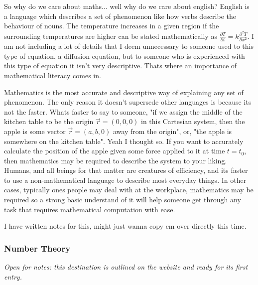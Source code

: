 \documentclass{article}
\newcounter{subsubsubsection}[subsubsection]
\begin{document}
So why do we care about maths... well why do we care about english? English is a language which describes a set of phenomenon like how verbs describe the behaviour of nouns. The temperature increases in a given region if the surrounding temperatures are higher can be stated mathematically as \begin{math} \frac{\partial{T}}{\partial{t}} = k \frac{\partial^{2} T}{\partial{x^{2}}} \end{math}. I am not including a lot of details that I deem unnecessary to someone used to this type of equation, a diffusion equation, but to someone who is experienced with this type of equation it isn't very descriptive. Thats where an importance of mathematical literacy comes in.

Mathematics is the most accurate and descriptive way of explaining any set of phenomenon. The only reason it doesn't supersede other languages is because its not the faster. Whats faster to say to someone, "if we assign the middle of the kitchen table to be the origin \begin{math} \vec{r} = (0, 0, 0) \end{math} in this Cartesian system, then the apple is some vector \begin{math} \vec{r} = (a, b, 0) \end{math} away from the origin", or, "the apple is somewhere on the kitchen table". Yeah I thought so. If you want to accurately calculate the position of the apple given some force applied to it at time \begin{math} t = t_0 \end{math}, then mathematics may be required to describe the system to your liking. Humans, and all beings for that matter are creatures of efficiency, and its faster to use a non-mathematical language to describe most everyday things. In other cases, typically ones people may deal with at the workplace, mathematics may be required so a strong basic understand of it will help someone get through any task that requires mathematical computation with ease. 

I have written notes for this, might just wanna copy em over directly this time. 

\subsubsection{Number Theory}\label{sec:number-theory}
\textit{Open for notes: this destination is outlined on the website and ready for its first entry.}
\end{document}
